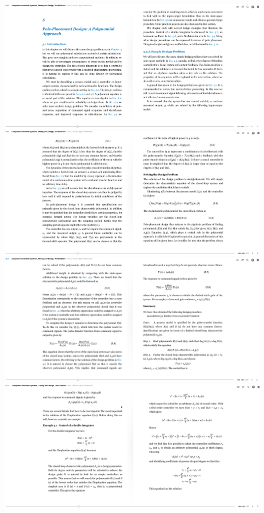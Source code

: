 \documentclass[varwidth=\maxdimen]{standalone}
\begin{document}
\includegraphics[]{aw5-1.png}\\

\includegraphics{aw5-2.png}\\

\includegraphics{aw5-3.png}\\

\includegraphics{aw5-4.png}
\end{document}
